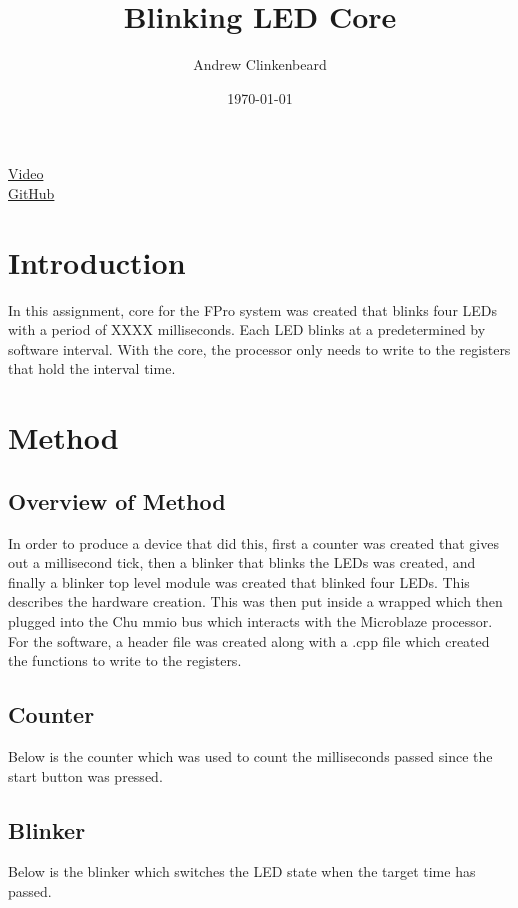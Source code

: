 \documentclass[12pt]{article}
\title{Blinking LED Core}
\author{Andrew Clinkenbeard}
\date{\today}
\newcommand{\Verilog}[2][]{%
	
}
\begin{document}
\maketitle
\href {https://www.youtube.com/watch?v=IYFFpxjsxYw} {Video}\\
\href {https://github.com/andrew-clinkenbeard/Blinking-Led-Core} {GitHub}
\section{Introduction}

In this assignment, core for the FPro system was created that blinks four LEDs with a period of XXXX milliseconds. Each LED blinks at a predetermined by software interval. With the core, the processor only needs to write to the registers that hold the interval time. 





\section{Method}
\subsection{Overview of Method}
In order to produce a device that did this, first a counter was created that gives out a millisecond tick, then a blinker that blinks the LEDs was created, and finally a blinker top level module was created that blinked four LEDs. This describes the hardware creation. This was then put inside a wrapped which then plugged into the Chu mmio bus which interacts with the Microblaze processor. For the software, a header file was created along with a .cpp file which created the functions to write to the registers.

\subsection{Counter}
Below is the counter which was used to count the milliseconds passed since the start button was pressed.
\Verilog[firstline=4]{./counter.sv}
\subsection{Blinker}
Below is the blinker which switches the LED state when the target time has passed.
\Verilog[firstline=4]{./blinker.sv}
\end{document}
